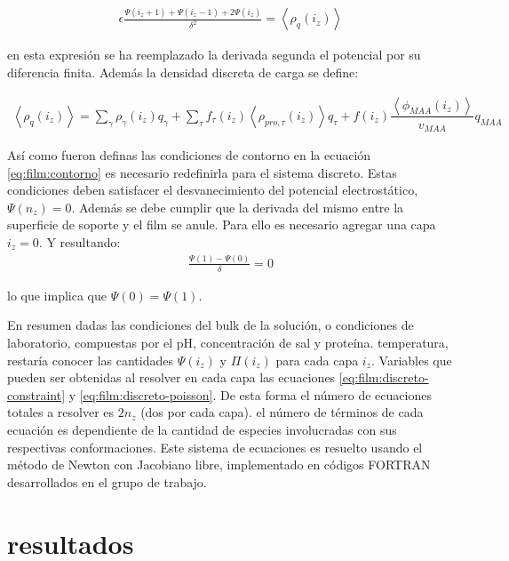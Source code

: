 \begin{align}
	\epsilon \frac{\Psi(i_z +1) + \Psi(i_z -1) +2\Psi(i_z)}{\delta^2} = \left< \rho_q(i_z)\right>
	\label{eq:film:discreto-poisson}
\end{align}

\noindent en esta expresi\'on se ha reemplazado la derivada segunda el potencial por su diferencia finita. Adem\'as la densidad discreta de carga se define:


\begin{align}
	\left<\rho_q(i_z)\right> = \sum_{\gamma } {\rho_\gamma(i_z) q_\gamma + \sum_\tau{f_\tau(i_z) \left<\rho_{pro,\tau}(i_z)\right> q_\tau} +  f(i_z)\dfrac{\left<\phi_{MAA}(i_z)\right>}{v_{MAA}}q_{MAA}}
	\label{eq:film:rho_charge-discreto}
\end{align}


As\'i como fueron definas las condiciones de contorno en la ecuaci\'on \ref{eq:film:contorno} es necesario redefinirla para el sistema discreto. Estas condiciones deben satisfacer el desvanecimiento del potencial electrost\'atico, $\Psi(n_z) =0 $. Adem\'as se debe cumplir que la derivada del mismo entre la superficie de soporte y el film se anule.
Para ello es necesario agregar una capa $i_z = 0$.
Y resultando:
\begin{align}
	\frac{\Psi(1) - \Psi(0)}{\delta} = 0
\end{align}

\noindent lo que implica que $\Psi(0) =  \Psi(1)$.

En resumen dadas las condiciones del bulk de la soluci\'on, o condiciones de laboratorio, compuestas por el pH, concentraci\'on de sal y prote\'ina. temperatura, restar\'ia conocer las cantidades $\Psi(i_z)$ y $\Pi(i_z)$ para cada capa $i_z$. Variables que pueden ser obtenidas al resolver en cada capa las ecuaciones \ref{eq:film:discreto-constraint} y \ref{eq:film:discreto-poisson}.
De esta forma el n\'umero de ecuaciones totales a resolver es $2n_z$ (dos por cada capa). el n\'umero de t\'erminos de cada ecuaci\'on es dependiente de la cantidad de especies involucradas con sus respectivas conformaciones. 
Este sistema de ecuaciones es resuelto usando el m\'etodo de Newton con Jacobiano libre, implementado en c\'odigos FORTRAN desarrollados en el grupo de trabajo.

\section{resultados} \label{sec:film:resultados}


